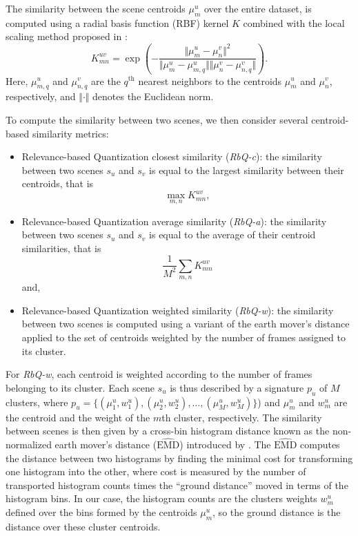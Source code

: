 \documentclass[journal]{IEEEtran}
\newcommand*{\EMD}{\mathrm{EMD}}
\begin{document}
The similarity between the scene centroids $\mu_m^u$ over the entire dataset, is computed using a radial basis function (RBF) kernel $K$ combined with the local scaling method proposed in \cite{selfTuneManor2004}:
\begin{equation}
\label{eq:kc}
K_{mn}^{uv} = \exp\left( - \dfrac{\Vert \mu_m^u - \mu_n^v \Vert^2}{\Vert \mu_m^u - \mu_{m,q}^u \Vert \Vert \mu_n^v - \mu_{n,q}^v \Vert} \right).
\end{equation} 
Here, $\mu_{m,q}^u$ and $\mu_{n,q}^v$ are the $q^{\textrm{th}}$ nearest neighbors to the centroids $\mu_m^u$ and $\mu_n^v$, respectively, and $\Vert \cdot \Vert$ denotes the Euclidean norm.

To compute the similarity between two scenes, we then consider several centroid-based similarity metrics:
\begin{itemize}
\item Relevance-based Quantization closest similarity (\emph{RbQ-c}): the similarity between two scenes $s_u$ and $s_v$ is equal to the largest similarity between their centroids, that is
\begin{equation}
	\max_{m,n} K_{mn}^{uv},
\end{equation}
\item Relevance-based Quantization average similarity  (\emph{RbQ-a}): the similarity between two scenes $s_u$ and $s_v$ is equal to the average of their centroid similarities, that is
\begin{equation}
	\frac{1}{M^2} \sum_{m,n} K_{mn}^{uv}
\end{equation}
and,
\item Relevance-based Quantization weighted similarity  (\emph{RbQ-w}): the similarity between two scenes is computed using a variant of the earth mover's distance applied to the set of centroids weighted by the number of frames assigned to its cluster.
\end{itemize}

For \emph{RbQ-w}, each centroid is weighted according to the number of frames belonging to its cluster. Each scene $s_u$ is thus described by a signature $p_u$ of $M$ clusters, where $p_u=\lbrace(\mu_1^u,w_1^u),(\mu_2^u,w_2^u),\ldots,(\mu_M^u,w_M^u)\rbrace$) and $\mu_m^u$ and $w_m^u$ are the centroid and the weight of the $m$th cluster, respectively. The similarity between scenes is then given by a cross-bin histogram distance known as the non-normalized earth mover's distance ($\widehat{\EMD}$) introduced by \cite{pele2008linear}. The $\widehat{\EMD}$ computes the distance between two histograms by finding the minimal cost for transforming one histogram into the other, where cost is measured by the number of transported histogram counts times the ``ground distance'' moved in terms of the histogram bins. In our case, the histogram counts are the clusters weights $w_m^u$ defined over the bins formed by the centroids $\mu_m^u$, so the ground distance is the distance over these cluster centroids.
\end{document}
